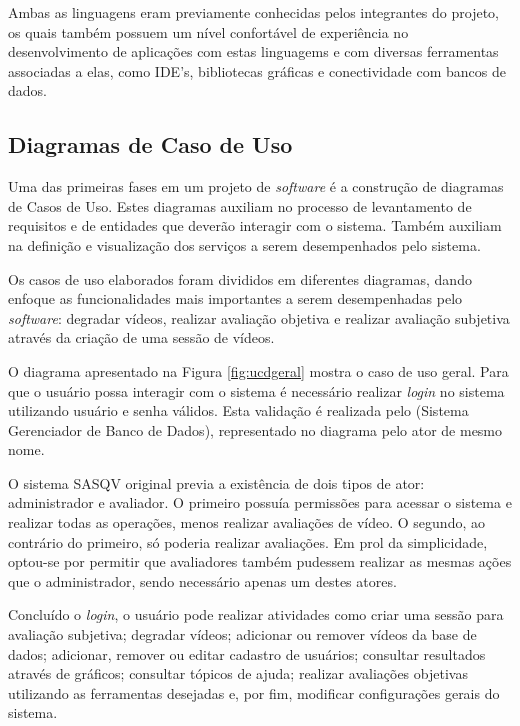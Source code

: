 Ambas as linguagens eram previamente conhecidas pelos integrantes do projeto, os quais também possuem um nível confortável de experiência no desenvolvimento de aplicações com estas linguagems e com diversas ferramentas associadas a elas, como IDE's, bibliotecas gráficas e conectividade com bancos de dados.

\subsection{Diagramas de Caso de Uso}

Uma das primeiras fases em um projeto de \emph{software} é a construção de diagramas de Casos de Uso. Estes diagramas auxiliam no processo de levantamento de requisitos e de entidades que deverão interagir com o sistema. Também auxiliam na definição e visualização dos serviços a serem desempenhados pelo sistema.

Os casos de uso elaborados foram divididos em diferentes diagramas, dando enfoque as funcionalidades mais importantes a serem desempenhadas pelo \emph{software}: degradar vídeos, realizar avaliação objetiva e realizar avaliação subjetiva através da criação de uma sessão de vídeos.

O diagrama apresentado na Figura \ref{fig:ucdgeral} mostra o caso de uso geral. Para que o usuário possa interagir com o sistema é necessário realizar \emph{login} no sistema utilizando usuário e senha válidos. Esta validação é realizada pelo  (Sistema Gerenciador de Banco de Dados), representado no diagrama pelo ator de mesmo nome.

O sistema SASQV original previa a existência de dois tipos de ator: administrador e avaliador. O primeiro possuía permissões para acessar o sistema e realizar todas as operações, menos realizar avaliações de vídeo. O segundo, ao contrário do primeiro, só poderia realizar avaliações. Em prol da simplicidade, optou-se por permitir que avaliadores também pudessem realizar as mesmas ações que o administrador, sendo necessário apenas um destes atores.

Concluído o \emph{login}, o usuário pode realizar atividades como criar uma sessão para avaliação subjetiva; degradar vídeos; adicionar ou remover vídeos da base de dados; adicionar, remover ou editar cadastro de usuários; consultar resultados através de gráficos; consultar tópicos de ajuda; realizar avaliações objetivas utilizando as ferramentas desejadas e, por fim, modificar configurações gerais do sistema.


